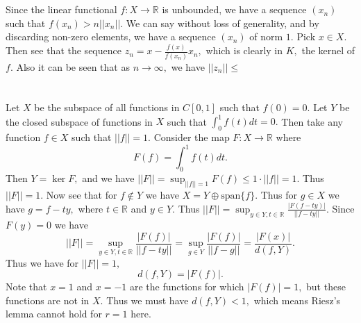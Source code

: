\documentclass{article}
\begin{document}
\section{} %
Since the linear functional $f:X \rightarrow \mathbb{R}$ is unbounded, we have a sequence $(x_n)$ such that $f(x_n) > n ||x_n||.$ We can say without loss of 
generality, and by discarding non-zero elements, we have a sequence $(x_n)$ of norm $1.$ Pick $x \in X.$ Then see that the sequence 
$z_n=x-\frac{f(x)}{f(x_n)}x_n,$ which is clearly in $K,$ the kernel of $f.$ Also it can be seen that as $n \to \infty,$ we have $||z_n|| \leq$
\section{} %
Let $X$ be the subspace of all functions in $C[0,1]$ such that $f(0)=0.$ Let $Y$ be the closed subspace of functions in $X$ such that $\int_{0}^{1}f(t)dt = 
0.$ Then take any function $f \in X$ such that $||f|| =1.$ Consider the map $F: X \to \mathbb{R}$ where $$F(f)= \int_{0}^1 f(t)dt. $$
Then $Y= \ker F,$ and we have $ ||F|| = \sup_{||f|| =1} F(f) \leq 1 \cdot ||f||=1.$ Thus $||F|| =1.$
Now see that for $f \notin Y$ we have $ X=Y \oplus \text{span}\{f\}.$ Thus for $g \in X$ we have $g=f-ty,$ where $t \in \mathbb{R}$ and $y \in Y.$ 
Thus $||F|| = \sup_{y \in Y, t \in \mathbb{R}}\frac{|F(f-ty)|}{||f-ty||}.$ 
Since $F(y)=0$ we have $$ ||F|| = \sup_{y \in Y, t \in \mathbb{R}}\frac{|F(f)|}{||f-ty||}=\sup_{g \in Y}\frac{|F(f)|}{||f-g||}=\frac{|F(x)|}{d(f,Y)}.$$
Thus we have for $||F||=1,$ $$d(f,Y)= |F(f)|.$$
Note that $x=1$ and $x=-1$ are the functions for which $|F(f)|=1,$ but these functions are not in $X.$ Thus we must have $d(f,Y)<1,$ which means Riesz's 
lemma cannot hold for $r=1 $ here.
\end{document}
